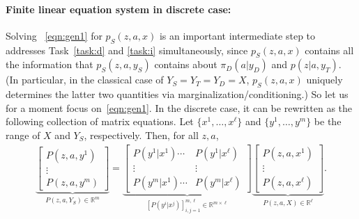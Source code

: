 \documentclass[letterpaper]{article} %
\theoremstyle{definition}%
\theoremstyle{definition}
\newcommand{\Obs}{Y}
\newcommand{\obs}{y}
\newcommand{\out}{z}
\newcommand{\todo}[1]{\textcolor{red}{#1}}
\begin{document}
\newcommand{\w}{P(\out, a, X)}
\newcommand{\F}{[P( y^i | x^j)]_{i,j=1}^{m, \ell}}
\newcommand{\vv}{P(\out, a, Y_S)}


\paragraph{Finite linear equation system in discrete case:}
Solving %
~\eqref{eqn:gen1} for $p_S(z, a, x)$ is an important intermediate step to addresses Task~\ref{task:d} and \ref{task:i} simultaneously, since $p_S(z, a, x)$ contains all the information that $p_S(z, a, \obs_S)$ contains about $\pi_D(a|y_D)$ and $p(\out | a, y_T)$.
(In particular, in the classical case of $Y_S=Y_T=Y_D=X$, $p_S(z, a, x)$ uniquely determines the latter two quantities via marginalization/conditioning.)
So let us for a moment focus on~\eqref{eqn:gen1}.
In the discrete case, it can be rewritten as the following collection of matrix equations.
Let  $\{ x^1, \ldots, x^\ell \}$ and $\{ y^1, \ldots, y^m \}$ be the range of $X$ and $\Obs_S$, respectively.
Then, for all $ \out, a$,
	\begin{align}
	\underbrace{\left[ \!\!\!\begin{array}{c} P(\out, a, \obs^1) \\ \vdots \\ P(\out, a, \obs^m) \end{array} \!\!\right]}_{\vv \in \mathbb{R}^{m}} \!\!\!=\!\!\!
	\underbrace{\left[ \!\!\!\begin{array}{cc} P( y^1 | x^1) \cdots\!\!\!\!\!\! \!\!  & P( y^1 | x^\ell) \\ \vdots & \vdots \\   P( y^m | x^1)  \cdots\!\!\!\!\!\! \!\!  & P( y^m | x^\ell) \end{array}\!\!\! \right]}_{\F \in \mathbb{R}^{  m \times \ell} } \!
	\underbrace{\left[ \!\!\!\begin{array}{c} P(\out, a, x^1) \\ \vdots \\ P(\out, a, x^\ell) \end{array} \!\!\!\right]}_{P(\out, a, X)  \in \mathbb{R}^{\ell}} \!\!. \label{eqn:possible}
	\end{align}
%
%
\end{document}
